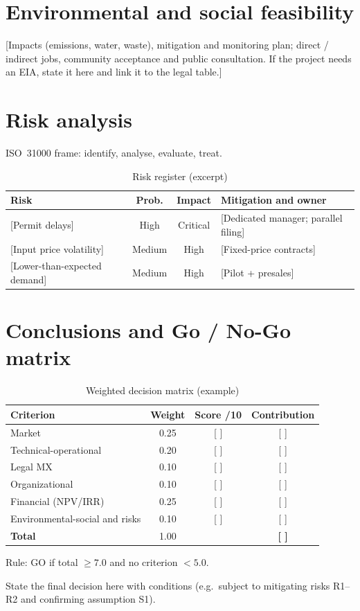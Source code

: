 \documentclass[12pt]{article}
\begin{document}
\section{Environmental and social feasibility}
\label{sec:amb}
[Impacts (emissions, water, waste), mitigation and monitoring plan; direct /
indirect jobs, community acceptance and public consultation. If the project
needs an EIA, state it here and link it to the legal table.]

\section{Risk analysis}
ISO~31000 frame: identify, analyse, evaluate, treat.
\begin{table}[h]
  \centering
  \caption{Risk register (excerpt)}
  \begin{tabular}{p{}ccp{}}
    \toprule
    Risk & Prob. & Impact & Mitigation and owner \\
    \midrule
    {[Permit delays]} & High & Critical & [Dedicated manager; parallel filing] \\
    {[Input price volatility]} & Medium & High & [Fixed-price contracts] \\
    {[Lower-than-expected demand]} & Medium & High & [Pilot + presales] \\
    \bottomrule
  \end{tabular}
\end{table}

\section{Conclusions and Go / No-Go matrix}
\label{sec:gongo}
\begin{table}[h]
  \centering
  \caption{Weighted decision matrix (example)}
  \begin{tabular}{lccc}
    \toprule
    Criterion & Weight & Score /10 & Contribution \\
    \midrule
    Market & 0.25 & [ ] & [ ] \\
    Technical-operational & 0.20 & [ ] & [ ] \\
    Legal MX & 0.10 & [ ] & [ ] \\
    Organizational & 0.10 & [ ] & [ ] \\
    Financial (NPV/IRR) & 0.25 & [ ] & [ ] \\
    Environmental-social and risks & 0.10 & [ ] & [ ] \\
    \midrule
    \textbf{Total} & 1.00 & & \textbf{[ ]} \\
    \bottomrule
  \end{tabular}
\end{table}
Rule: GO if total $\geq 7.0$ and no criterion $< 5.0$.
\begin{bftGoBox}
  State the final decision here with conditions (e.g.\ subject to
  mitigating risks R1–R2 and confirming assumption S1).
\end{bftGoBox}
\end{document}
